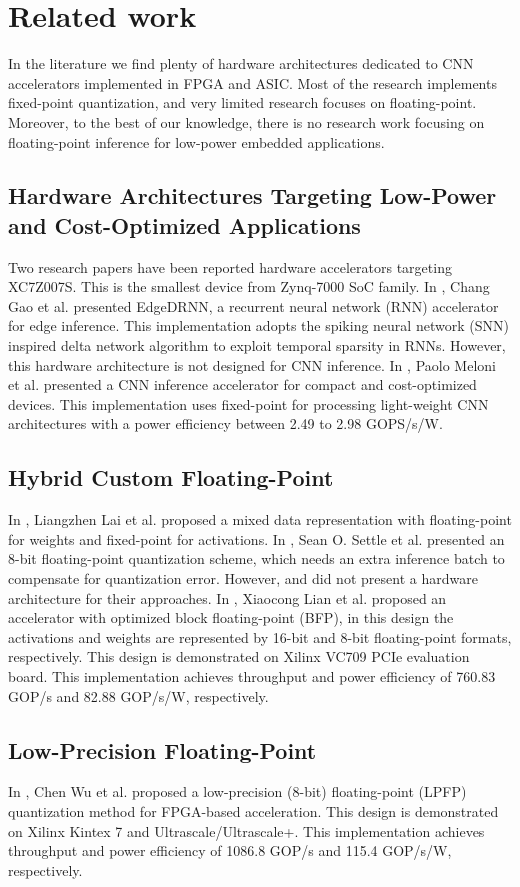 \section{Related work}
\label{sec:related_work}
In the literature we find plenty of hardware architectures
dedicated to CNN accelerators implemented in FPGA and ASIC. Most of the research implements fixed-point quantization, and very limited research focuses on floating-point. Moreover, to the best of our knowledge, there is no research work focusing on floating-point inference for low-power embedded applications.
\subsection{Hardware Architectures Targeting Low-Power and Cost-Optimized Applications}
Two research papers have been reported hardware accelerators targeting XC7Z007S. This is the smallest device from Zynq-7000 SoC family. In \cite{gao2020edgedrnn}, Chang Gao et al. presented EdgeDRNN, a recurrent neural network (RNN) accelerator for edge inference. This implementation adopts the spiking neural network (SNN) inspired delta network algorithm to exploit temporal sparsity in RNNs. However, this hardware architecture is not designed for CNN inference. In \cite{meloni2019cnn}, Paolo Meloni et al. presented a CNN inference accelerator for compact and cost-optimized devices. This implementation uses fixed-point for processing light-weight CNN architectures with a power efficiency between 2.49 to 2.98 GOPS/s/W.

\subsection{Hybrid Custom Floating-Point}
In \cite{lai2017deep}, Liangzhen Lai et al. proposed a mixed data representation with floating-point for weights and fixed-point for activations. In \cite{settle2018quantizing}, Sean O. Settle et al. presented an 8-bit floating-point quantization scheme, which needs an extra inference batch to compensate for quantization error. However, \cite{lai2017deep} and \cite{settle2018quantizing} did not present a hardware architecture for their approaches. In \cite{lian2019high}, Xiaocong Lian et al. proposed an accelerator with optimized block floating-point (BFP), in this design the activations and weights are represented by 16-bit and 8-bit floating-point formats, respectively. This design is demonstrated on Xilinx VC709 PCIe evaluation board. This implementation achieves throughput and power efficiency of 760.83 GOP/s and 82.88 GOP/s/W, respectively.

\subsection{Low-Precision Floating-Point}
In \cite{wu2021low}, Chen Wu et al. proposed a low-precision (8-bit) floating-point (LPFP) quantization method for FPGA-based acceleration. This design is demonstrated on Xilinx Kintex 7 and Ultrascale/Ultrascale+. This implementation achieves throughput and power efficiency of 1086.8 GOP/s and 115.4 GOP/s/W, respectively.